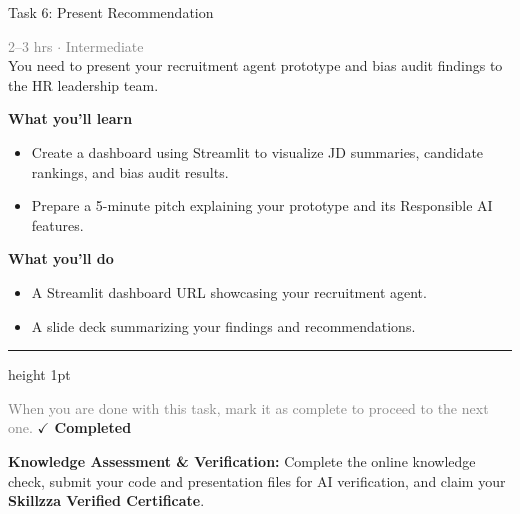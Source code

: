 \documentclass[10pt,a4paper]{article}
\begin{document}
\begin{taskbox}{Task 6: Present Recommendation}

    {\small \textcolor{gray}{2--3 hrs $\cdot$ Intermediate}}\\[12pt]

     You need to present your recruitment agent prototype and bias audit findings to the HR leadership team.  


\vspace{8pt}
{\large \textbf{\textcolor{brandLight}{What you'll learn}}}\\[4pt]  
\begin{itemize}
    \item Create a dashboard using Streamlit to visualize JD summaries, candidate rankings, and bias audit results.  
    \item Prepare a 5-minute pitch explaining your prototype and its Responsible AI features.  
\end{itemize}

\vspace{8pt}
{\large \textbf{\textcolor{brandLight}{What you'll do}}}\\[4pt]  
\begin{itemize}
    \item A Streamlit dashboard URL showcasing your recruitment agent.  
    \item A slide deck summarizing your findings and recommendations.\par
\end{itemize}

    \vspace{16pt}

    \textcolor{cardBorder}{\hrule height 1pt}\vspace{8pt}

    \small \textcolor{gray}{When you are done with this task, mark it as complete to proceed to the next one.} \hfill \textbf{\textcolor{brandDark}{$\checkmark$ Completed}}

\end{taskbox}

\begin{completionbox}
    \textbf{Knowledge Assessment \& Verification:} Complete the online knowledge check, submit your code and presentation files for AI verification, and claim your \textbf{Skillzza Verified Certificate}.
\end{completionbox}

\newpage

\end{document}
